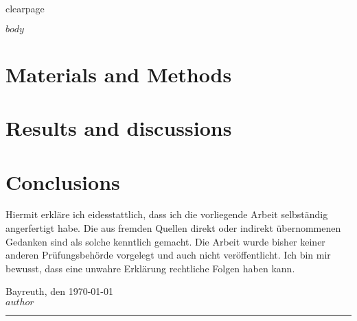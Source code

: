 \documentclass[headsepline, twoside, openright]{scrreprt}
\numberwithin{equation}{chapter}
\begin{document}
clearpage

\clearpage

$body$

\chapter{Materials and Methods}
\chapter{Results and discussions}
\chapter{Conclusions}
%




\newpage
{}
\appendix
\makeatletter {} \makeatother
\makeatletter {} \makeatother
\renewcommand*{\thechapter}{\Alph{section}}
\renewcommand\thefigure{\Alph{section}.\arabic{figure}}
\renewcommand\thetable{\Alph{section}.\arabic{table}}



\vspace{5em}
\noindent
Hiermit erkl\"{a}re ich eidesstattlich, dass ich die vorliegende Arbeit selbst\"{a}ndig angerfertigt habe. Die aus fremden Quellen direkt oder indirekt \"{u}bernommenen Gedanken sind als solche kenntlich gemacht. Die Arbeit wurde bisher keiner anderen Pr\"{u}fungsbeh\"{o}rde vorgelegt und auch nicht ver\"{o}ffentlicht.  Ich bin mir bewusst, dass eine unwahre Erkl\"{a}rung rechtliche Folgen haben kann.

\vspace{7em}
\noindent
Bayreuth, den \today
\\[2em]

$author$

\noindent
\rule[-0.1cm]{5cm}{0.01cm}\\
\end{document}
